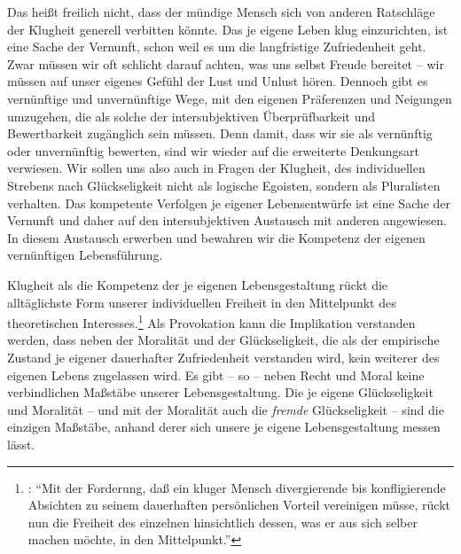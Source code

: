 Das heißt freilich nicht, dass der mündige Mensch sich von anderen Ratschläge
der Klugheit generell verbitten könnte. Das je eigene Leben klug einzurichten,
ist eine Sache der Vernunft, schon weil es um die langfristige Zufriedenheit
geht. Zwar müssen wir oft schlicht darauf achten, was uns selbst Freude bereitet
-- wir müssen auf unser eigenes Gefühl der Lust und Unlust hören. Dennoch gibt
es vernünftige und unvernünftige Wege, mit den eigenen Präferenzen und Neigungen
umzugehen, die als solche der intersubjektiven Überprüfbarkeit und Bewertbarkeit
zugänglich sein müssen. Denn damit, dass wir sie als vernünftig oder
unvernünftig bewerten, sind wir wieder auf die erweiterte Denkungsart verwiesen.
Wir sollen uns also auch in Fragen der Klugheit, des individuellen Strebens nach
Glückseligkeit nicht als logische Egoisten, sondern als Pluralisten verhalten.
Das kompetente Verfolgen je eigener Lebensentwürfe ist eine Sache der Vernunft
und daher auf den intersubjektiven Austausch mit anderen angewiesen. In diesem
Austausch erwerben und bewahren wir die Kompetenz der eigenen vernünftigen
Lebensführung.

Klugheit als die Kompetenz der je eigenen Lebensgestaltung rückt die
alltäglichste Form unserer individuellen Freiheit in den Mittelpunkt des theoretischen
Interesses.\footnote{\cite[Vgl.][158]{Schwaiger:KlugheitbeiKant2002}:
\enquote{Mit der Forderung, daß ein kluger Mensch divergierende bis
konfligierende Absichten zu seinem dauerhaften persönlichen Vorteil vereinigen
müsse, rückt nun die Freiheit des einzelnen hinsichtlich dessen, was er aus sich
selber machen möchte, in den Mittelpunkt.}} Als Provokation kann die Implikation
verstanden werden, dass neben der Moralität und der Glückseligkeit, die als
der empirische Zustand je eigener dauerhafter Zufriedenheit verstanden wird,
kein weiterer  des eigenen Lebens zugelassen wird. Es gibt -- so
 -- neben Recht und Moral keine verbindlichen Maßstäbe
unserer Lebensgestaltung. Die je eigene Glückseligkeit und Moralität -- und mit
der Moralität auch die \emph{fremde} Glückseligkeit -- sind die einzigen
Maßstäbe, anhand derer sich unsere je eigene Lebensgestaltung messen lässt.


